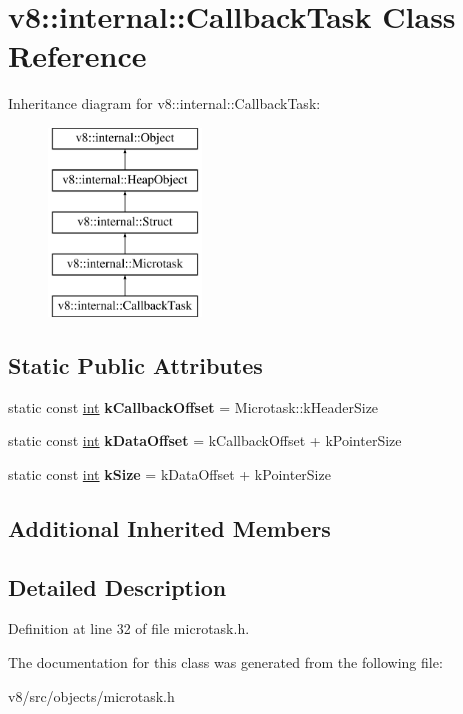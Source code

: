 \hypertarget{classv8_1_1internal_1_1CallbackTask}{}\section{v8\+:\+:internal\+:\+:Callback\+Task Class Reference}
\label{classv8_1_1internal_1_1CallbackTask}
Inheritance diagram for v8\+:\+:internal\+:\+:Callback\+Task\+:\begin{figure}[H]
\begin{center}
\leavevmode
\includegraphics[height=5.000000cm]{classv8_1_1internal_1_1CallbackTask}
\end{center}
\end{figure}
\subsection*{Static Public Attributes}
\begin{DoxyCompactItemize}
\item 
\mbox{\label{classv8_1_1internal_1_1CallbackTask_a277d1c76201459136eab5c0f84c25fca}} 
static const \mbox{\hyperlink{classint}{int}} {\bfseries k\+Callback\+Offset} = Microtask\+::k\+Header\+Size
\item 
\mbox{\label{classv8_1_1internal_1_1CallbackTask_a60c061fe0f01f5d5947e1f0c123e2e9a}} 
static const \mbox{\hyperlink{classint}{int}} {\bfseries k\+Data\+Offset} = k\+Callback\+Offset + k\+Pointer\+Size
\item 
\mbox{\label{classv8_1_1internal_1_1CallbackTask_ae1e8a8bb6f7e85bd92387412faab9862}} 
static const \mbox{\hyperlink{classint}{int}} {\bfseries k\+Size} = k\+Data\+Offset + k\+Pointer\+Size
\end{DoxyCompactItemize}
\subsection*{Additional Inherited Members}


\subsection{Detailed Description}


Definition at line 32 of file microtask.\+h.



The documentation for this class was generated from the following file\+:\begin{DoxyCompactItemize}
\item 
v8/src/objects/microtask.\+h\end{DoxyCompactItemize}
